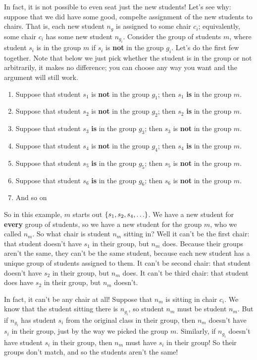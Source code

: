\documentclass[10pt]{article}
\begin{document}
In fact, it is not possible to even seat just the new students!
Let's see why: suppose that we did have some good, compelte assignment of the new students to chairs.
That is, each new student $n_g$ is assigned to some chair $c_i$; equivalently, some chair $c_i$ has some new student $n_{g_i}$.
Consider the group of students $m$, where student $s_i$ is in the group $m$ if $s_i$ is \textbf{not} in the group $g_i$.
Let's do the first few together.
Note that below we just pick whether the student is in the group or not arbitrarily, it makes no difference; you can choose any way you want and the argument will still work.

\begin{enumerate}
    \item Suppose that student $s_1$ is \textbf{not} in the group $g_1$; then $s_1$ \textbf{is} in the group $m$.
    \item Suppose that student $s_2$ is \textbf{not} in the group $g_2$; then $s_2$ \textbf{is} in the group $m$.
    \item Suppose that student $s_3$ \textbf{is} in the group $g_3$; then $s_3$ is \textbf{not} in the group $m$.
    \item Suppose that student $s_4$ is \textbf{not} in the group $g_4$; then $s_4$ \textbf{is} in the group $m$.
    \item Suppose that student $s_5$ \textbf{is} in the group $g_5$; then $s_5$ is \textbf{not} in the group $m$.
    \item Suppose that student $s_6$ \textbf{is} in the group $g_6$; then $s_6$ is \textbf{not} in the group $m$.
    \item And so on
\end{enumerate}

So in this example, $m$ starts out ${\left\{ {s_1, s_2, s_4, \ldots} \right\}}$.
We have a new student for \textbf{every} group of students, so we have a new student for the group $m$, who we called $n_m$.
So what chair is student $n_m$ sitting in?
Well it can't be the first chair: that student doesn't have $s_1$ in their group, but $n_m$ does.
Because their groups aren't the same, they can't be the same student, because each new student has a unique group of students assigned to them.
It can't be second chair: that student doesn't have $s_2$ in their group, but $n_m$ does.
It can't be third chair: that student does have $s_2$ in their group, but $n_m$ doesn't.

In fact, it can't be any chair at all!
Suppose that $n_m$ is sitting in chair $c_i$.
We know that the student sitting there is $n_{g_i}$, so student $n_m$ must be student $n_m$.
But if $n_{g_i}$ has student $s_i$ from the original class in their group, then $n_m$ doesn't have $s_i$ in their group, just by the way we picked the group $m$.
Similarly, if $n_{g_i}$ doesn't have student $s_i$ in their group, then $n_m$ must have $s_i$ in their group!
So their groups don't match, and so the students aren't the same!
\end{document}
